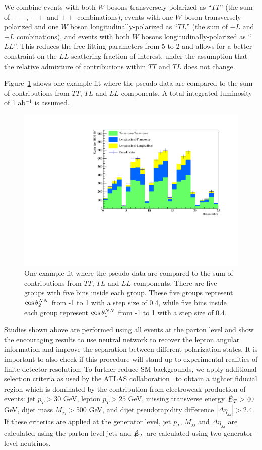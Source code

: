 We combine events with both $W$ bosons transversely-polarized as
``$TT$'' (the sum of $--$, $-+$ and $++$ combinations), events with
one $W$ boson transversely-polarized and one $W$ boson
longitudinally-polarized as ``$TL$'' (the sum of $-L$ and $+L$
combinations), and events with both $W$ bosons
longitudinally-polarized as ``$LL$''. This reduces the free fitting parameters from 5 to 2 and 
allows for a better constraint on the $LL$ scattering fraction of interest, under the assumption that
the relative admixture of contributions within $TT$ and $TL$ does not change. 

Figure~\ref{fig:fit_example} shows one example fit where the pseudo data are compared to the sum of 
contributions from $TT$, $TL$ and $LL$ components. A total integrated luminosity of 1 ab$^{-1}$ is assumed.  

\begin{figure}[h]
\includegraphics[width=.49\textwidth]{./fig/NN_fit_3.pdf}
\caption{\label{fig:fit_example} One example fit where the pseudo data are compared to the sum of 
contributions from $TT$, $TL$ and $LL$ components. There are five groups with five bins inside each group. 
These five groups represent $ \cos \theta^{NN}  _2$ from -1 to 1 with a step size of 0.4, while five bins inside each group represent $ \cos \theta^{NN}  _1$ from -1 to 1 with a step size of 0.4.}
\end{figure}

Studies shown above are performed using all events at the parton level  
and show the encouraging results to use neutral network to recover the lepton angular information and improve the separation between different polarization states. 
It is important to also check if this procedure will stand up to experimental realities of finite detector resolution. 
To further reduce SM backgrounds, we apply additional selection criteria as used by the ATLAS collaboration~\cite{ATLAS_ssWW} to obtain a
tighter fiducial region which is dominated by the contribution from electroweak production of \ssWW events: jet $p_T > 30$ GeV, lepton $p_T > 25$ GeV, missing transverse energy $\slashed{E}_T > 40$ GeV, 
dijet mass $M_{jj} > $500 GeV, and dijet pseudorapidity difference $|\Delta \eta_{jj}| > 2.4 $. 
If these criterias are applied at the generator level, jet $p_T$, $M_{jj}$ and $\Delta \eta_{jj}$ are calculated using the parton-level jets 
and $\slashed{E}_T$ are calculated using two generator-level neutrinos.

